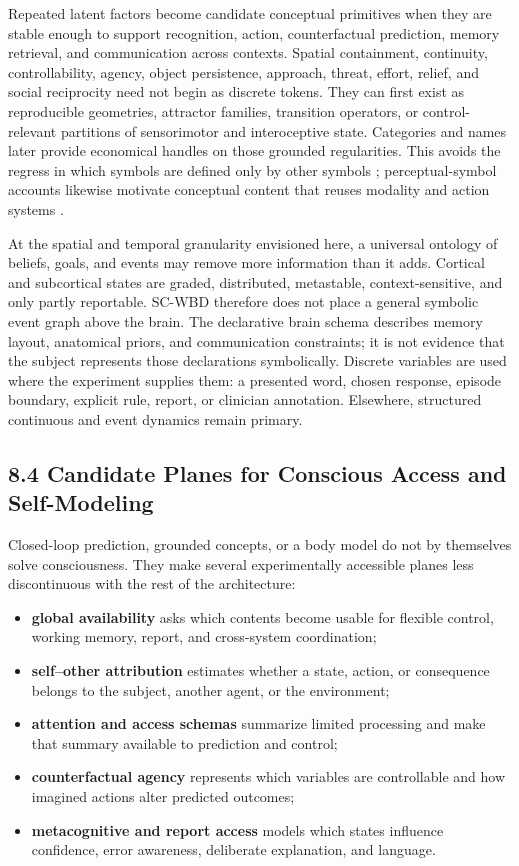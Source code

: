 Repeated latent factors become candidate conceptual primitives when they are
stable enough to support recognition, action, counterfactual prediction,
memory retrieval, and communication across contexts. Spatial containment,
continuity, controllability, agency, object persistence, approach, threat,
effort, relief, and social reciprocity need not begin as discrete tokens. They
can first exist as reproducible geometries, attractor families, transition
operators, or control-relevant partitions of sensorimotor and interoceptive
state. Categories and names later provide economical handles on those grounded
regularities. This avoids the regress in which symbols are defined only by
other symbols \citep{harnad1990}; perceptual-symbol accounts likewise motivate
conceptual content that reuses modality and action systems
\citep{barsalou1999}.

At the spatial and temporal granularity envisioned here, a universal ontology
of beliefs, goals, and events may remove more information than it adds.
Cortical and subcortical states are graded, distributed, metastable,
context-sensitive, and only partly reportable. SC-WBD therefore does not
place a general symbolic event graph above the brain. The declarative brain
schema describes memory layout, anatomical priors, and communication
constraints; it is not evidence that the subject represents those declarations
symbolically. Discrete variables are used where the experiment supplies them:
a presented word, chosen response, episode boundary, explicit rule, report, or
clinician annotation. Elsewhere, structured continuous and event dynamics
remain primary.

\subsection{8.4 Candidate Planes for Conscious Access and Self-Modeling}

Closed-loop prediction, grounded concepts, or a body model do not by
themselves solve consciousness. They make several experimentally accessible
planes less discontinuous with the rest of the architecture:

\begin{itemize}
\item \textbf{global availability} asks which contents become usable for
  flexible control, working memory, report, and cross-system coordination;
\item \textbf{self--other attribution} estimates whether a state, action, or
  consequence belongs to the subject, another agent, or the environment;
\item \textbf{attention and access schemas} summarize limited processing and
  make that summary available to prediction and control;
\item \textbf{counterfactual agency} represents which variables are
  controllable and how imagined actions alter predicted outcomes;
\item \textbf{metacognitive and report access} models which states influence
  confidence, error awareness, deliberate explanation, and language.
\end{itemize}

